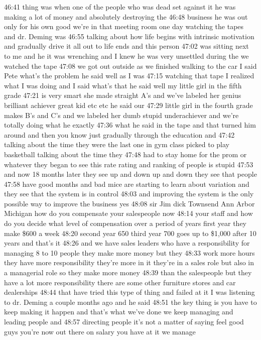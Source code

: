\documentclass[
]{book}
\begin{document}
46:41
thing was when one of the people who was dead set against it he was making a lot of money and absolutely destroying the
46:48
business he was out only for his own good we're in that meeting room one day watching the tapes and dr. Deming was
46:55
talking about how life begins with intrinsic motivation and gradually drive it all out to life ends and this person
47:02
was sitting next to me and he it was wrenching and I knew he was very unsettled during the we watched the tape
47:08
we got out outside as we finished walking to the car I said Pete what's the problem he said well as I was
47:15
watching that tape I realized what I was doing and I said what's that he said well my little girl in the fifth grade
47:21
is very smart she made straight A's and we've labeled her genius brilliant achiever great kid etc etc he said our
47:29
little girl in the fourth grade makes B's and C's and we labeled her dumb stupid underachiever and we're totally doing what he exactly
47:36
what he said in the tape and that turned him around and then you know just gradually through the education and
47:42
talking about the time they were the last one in gym class picked to play basketball talking about the time they
47:48
had to stay home for the prom or whatever they began to see this rate rating and ranking of people is stupid
47:53
and now 18 months later they see up and down up and down they see that people
47:58
have good months and bad mice are starting to learn about variation and they see that the system is in control
48:03
and improving the system is the only possible way to improve the business yes
48:08
sir Jim dick Townsend Ann Arbor Michigan how do you compensate your salespeople now
48:14
your staff and how do you decide what level of compensation over a period of years first year they make \$600 a week
48:20
second year 650 third year 700 goes up to \$1,000 after 10 years and that's it
48:26
and we have sales leaders who have a responsibility for managing 8 to 10 people they make more money but they
48:33
work more hours they have more responsibility they're more in it they're in a sales role but also in a managerial role so they make more money
48:39
than the salespeople but they have a lot more responsibility there are some other furniture stores and car dealerships
48:44
that have tried this type of thing and failed at it I was listening to dr. Deming a couple months ago and he said
48:51
the key thing is you have to keep making it happen and that's what we've done we keep managing and leading people and
48:57
directing people it's not a matter of saying feel good guys you're now out there on salary you have at it we manage
\end{document}
